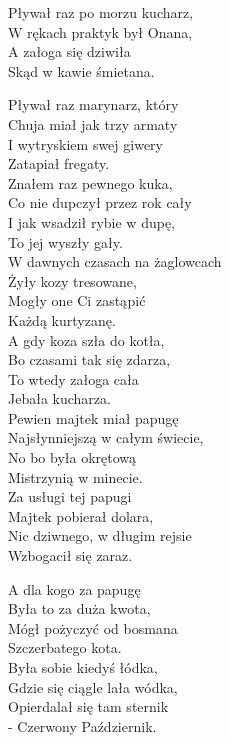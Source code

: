 \begin{multicols}{2}
Pływał raz po morzu kucharz, \\
W rękach praktyk był Onana, \\
A załoga się dziwiła\\
Skąd w kawie śmietana.\\
\newcolumn

Pływał raz marynarz, który\\
Chuja miał jak trzy armaty\\
I wytryskiem swej giwery\\
Zatapiał fregaty. \\

Znałem raz pewnego kuka, \\
Co nie dupczył przez rok cały\\
I jak wsadził rybie w dupę, \\
To jej wyszły gały.\\

W dawnych czasach na żaglowcach\\
Żyły kozy tresowane, \\
Mogły one Ci zastąpić\\
Każdą kurtyzanę.\\

A gdy koza szła do kotła, \\
Bo czasami tak się zdarza, \\
To wtedy załoga cała\\
Jebała kucharza.\\

Pewien majtek miał papugę\\
Najsłynniejszą w całym świecie, \\
No bo była okrętową\\
Mistrzynią w minecie.\\

Za usługi tej papugi\\
Majtek pobierał dolara, \\
Nic dziwnego, w długim rejsie\\
Wzbogacił się zaraz.\\
\newcolumn

A dla kogo za papugę\\
Była to za duża kwota, \\
Mógł pożyczyć od bosmana\\
Szczerbatego kota.\\

Była sobie kiedyś łódka, \\
Gdzie się ciągle lała wódka, \\
Opierdalał się tam sternik\\
- Czerwony Październik.\\


\end{multicols}
